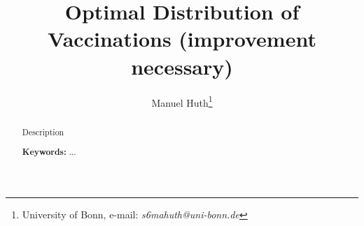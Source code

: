 
\title{Optimal Distribution of Vaccinations (improvement necessary)}

\author{Manuel Huth\thanks{University of Bonn, e-mail: \textit{s6mahuth@uni-bonn.de}}}

\maketitle

\sloppy

\singlespacing

\begin{abstract}

\noindent
Description




\strut

\noindent \textbf{Keywords:} ... \\

\end{abstract}

\thispagestyle{empty}

\clearpage
\onehalfspacing
